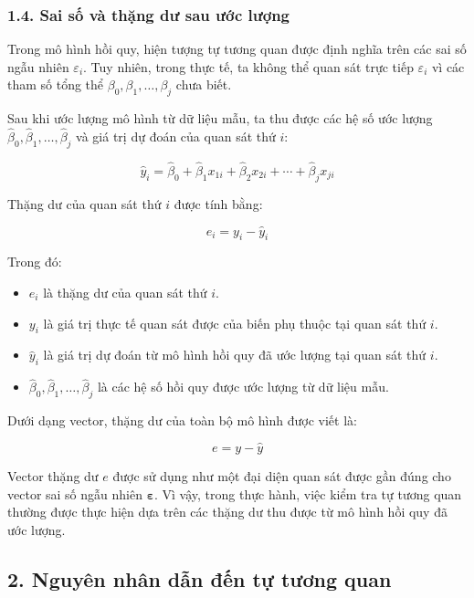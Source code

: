\subsubsection{1.4. Sai số và thặng dư sau ước lượng}

Trong mô hình hồi quy, hiện tượng tự tương quan được định nghĩa trên các sai số ngẫu nhiên $\varepsilon_i$. Tuy nhiên, trong thực tế, ta không thể quan sát trực tiếp $\varepsilon_i$ vì các tham số tổng thể $\beta_0,\beta_1,\ldots,\beta_j$ chưa biết.

Sau khi ước lượng mô hình từ dữ liệu mẫu, ta thu được các hệ số ước lượng
$\hat{\beta}_0,\hat{\beta}_1,\ldots,\hat{\beta}_j$ và giá trị dự đoán của quan sát thứ $i$:

\[
\hat{y}_i
=
\hat{\beta}_0
+
\hat{\beta}_1 x_{1i}
+
\hat{\beta}_2 x_{2i}
+
\cdots
+
\hat{\beta}_j x_{ji}
\]

Thặng dư của quan sát thứ $i$ được tính bằng:

\[
e_i
=
y_i-\hat{y}_i
\]

Trong đó:

\begin{itemize}
    \item $e_i$ là thặng dư của quan sát thứ $i$.
    
    \item $y_i$ là giá trị thực tế quan sát được của biến phụ thuộc tại quan sát thứ $i$.
    
    \item $\hat{y}_i$ là giá trị dự đoán từ mô hình hồi quy đã ước lượng tại quan sát thứ $i$.
    
    \item $\hat{\beta}_0,\hat{\beta}_1,\ldots,\hat{\beta}_j$ là các hệ số hồi quy được ước lượng từ dữ liệu mẫu.
\end{itemize}

Dưới dạng vector, thặng dư của toàn bộ mô hình được viết là:

\[
e
=
y-\hat{y}
\]

Vector thặng dư $e$ được sử dụng như một đại diện quan sát được gần đúng cho vector sai số ngẫu nhiên \(\boldsymbol{\varepsilon}\). Vì vậy, trong thực hành, việc kiểm tra tự tương quan thường được thực hiện dựa trên các thặng dư thu được từ mô hình hồi quy đã ước lượng. 

\subsection{2. Nguyên nhân dẫn đến tự tương quan}


